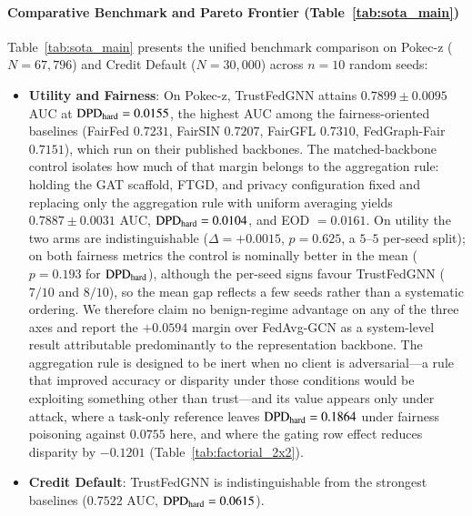 


\paragraph{Comparative Benchmark and Pareto Frontier (Table~\ref{tab:sota_main})}
\label{subsec:sota_comparison}
Table~\ref{tab:sota_main} presents the unified benchmark comparison on Pokec-z ($N=67{,}796$) and Credit Default ($N=30{,}000$) across $n=10$ random seeds:
\begin{itemize}[leftmargin=*]
    \item \textbf{Utility and Fairness}: On Pokec-z, TrustFedGNN attains $0.7899 \pm 0.0095$ AUC at $\mathrm{DPD}_{\mathrm{hard}} = 0.0155$, the highest AUC among the fairness-oriented baselines (FairFed $0.7231$, FairSIN $0.7207$, FairGFL $0.7310$, FedGraph-Fair $0.7151$), which run on their published backbones. The matched-backbone control isolates how much of that margin belongs to the aggregation rule: holding the GAT scaffold, FTGD, and privacy configuration fixed and replacing only the aggregation rule with uniform averaging yields $0.7887 \pm 0.0031$ AUC, $\mathrm{DPD}_{\mathrm{hard}} = 0.0104$, and EOD $= 0.0161$. On utility the two arms are indistinguishable ($\Delta = +0.0015$, $p = 0.625$, a $5$--$5$ per-seed split); on both fairness metrics the control is nominally better in the mean ($p = 0.193$ for $\mathrm{DPD}_{\mathrm{hard}}$), although the per-seed signs favour TrustFedGNN ($7/10$ and $8/10$), so the mean gap reflects a few seeds rather than a systematic ordering. We therefore claim no benign-regime advantage on any of the three axes and report the $+0.0594$ margin over FedAvg-GCN as a system-level result attributable predominantly to the representation backbone. The aggregation rule is designed to be inert when no client is adversarial---a rule that improved accuracy or disparity under those conditions would be exploiting something other than trust---and its value appears only under attack, where a task-only reference leaves $\mathrm{DPD}_{\mathrm{hard}} = 0.1864$ under fairness poisoning against $0.0755$ here, and where the gating row effect reduces disparity by $-0.1201$ (Table~\ref{tab:factorial_2x2}).
    \item \textbf{Credit Default}: TrustFedGNN is indistinguishable from the strongest baselines ($0.7522$ AUC, $\mathrm{DPD}_{\mathrm{hard}} = 0.0615$).

\end{itemize}
